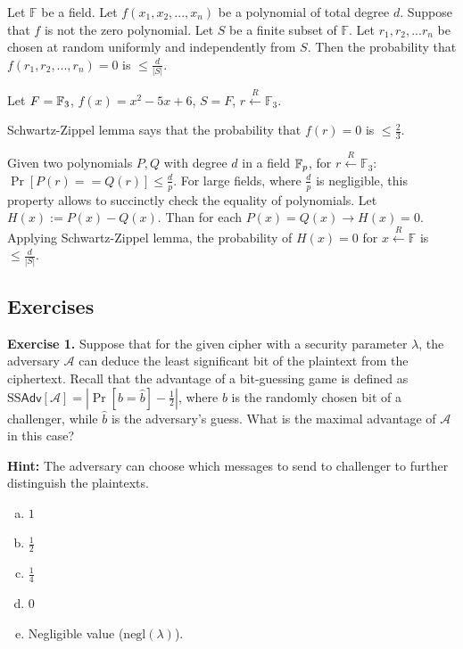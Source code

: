 \documentclass[../lecture-notes.tex]{subfiles}
\begin{document}
\begin{lemma}\label{lemma:sz}
Let $\mathbb{F}$ be a field. Let $f(x_1, x_2, ..., x_n)$ be a polynomial of total degree $d$. Suppose that $f$ is not the zero polynomial. Let $S$ be
a finite subset of $\mathbb{F}$. Let $r_1, r_2, ... r_n$ be chosen at random uniformly and independently from $S$. Then the probability that 
$f(r_1, r_2, ..., r_n) = 0$ is $\le \frac{d}{|S|}$.
\end{lemma}

\begin{example}
Let $F = \mathbb{F}_3$, $f(x) = x^2 - 5x + 6$, $S = F$, $r \xleftarrow{R} \mathbb{F}_3$.

Schwartz-Zippel lemma says that the probability that $f(r) = 0$ is $\le \frac{2}{3}$.
\end{example}

Given two polynomials $P, Q$ with  degree $d$ in a field $\mathbb{F}_p$, for $r \xleftarrow{R} \mathbb{F}_3$: $\Pr[P(r) == Q(r)] \le \frac{d}{p}$.
For large fields, where  $\frac{d}{p}$ is negligible, this property allows to succinctly check the equality of polynomials.
Let $H(x) := P(x) - Q(x)$. Than for each $P(x) = Q(x) \rightarrow H(x) = 0$. Applying Schwartz-Zippel lemma, 
the probability of $H(x) = 0$ for $x \xleftarrow{R} \mathbb{F} $ is $\le \frac{d}{|S|}$.

\subsection{Exercises}

\textbf{Exercise 1.} Suppose that for the given cipher with a security parameter $\lambda$, the adversary $\mathcal{A}$ can deduce the least significant bit of the plaintext from the ciphertext. Recall that the advantage 
of a bit-guessing game is defined as $\text{SS}\mathsf{Adv}[\mathcal{A}] = \left|\Pr[b=\hat{b}] - \frac{1}{2}\right|$, where $b$ is the randomly chosen bit of a challenger, while 
$\hat{b}$ is the adversary's guess. What is the maximal advantage of $\mathcal{A}$ in this case?

\textbf{Hint:} The adversary can choose which messages to send to challenger to further distinguish the plaintexts.

\begin{enumerate}[a)]
    \item $1$
    \item $\frac{1}{2}$
    \item $\frac{1}{4}$
    \item $0$
    \item Negligible value ($\text{negl}(\lambda)$).
\end{enumerate}
\end{document}
